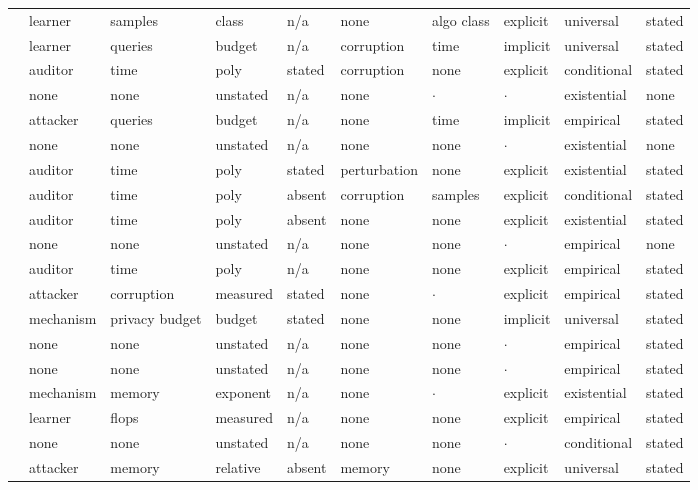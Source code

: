 \begin{landscape}
\begin{longtable}{rlllllllll}
\cite{WZDD24} & learner & samples & class & n/a & none & algo class & explicit & universal & stated \\
\cite{BBHS22} & learner & queries & budget & n/a & corruption & time & implicit & universal & stated \\
\cite{CHLX25} & auditor & time & poly & stated & corruption & none & explicit & conditional & stated \\
\cite{QMZAKFG24} & none & none & unstated & n/a & none & $\cdot$ & $\cdot$ & existential & none \\
\cite{NCM25} & attacker & queries & budget & n/a & none & time & implicit & empirical & stated \\
\cite{VG20} & none & none & unstated & n/a & none & none & $\cdot$ & existential & none \\
\cite{KKOSVZ24} & auditor & time & poly & stated & perturbation & none & explicit & existential & stated \\
\cite{GSVV25} & auditor & time & poly & absent & corruption & samples & explicit & conditional & stated \\
\cite{GKVZ22} & auditor & time & poly & absent & none & none & explicit & existential & stated \\
\cite{AKKTARXLNP25} & none & none & unstated & n/a & none & none & $\cdot$ & empirical & none \\
\cite{DGMRLW24} & auditor & time & poly & n/a & none & none & explicit & empirical & stated \\
\cite{RT24} & attacker & corruption & measured & stated & none & $\cdot$ & explicit & empirical & stated \\
\cite{SAHBS26} & mechanism & privacy budget & budget & stated & none & none & implicit & universal & stated \\
\cite{KJZXKOS25} & none & none & unstated & n/a & none & none & $\cdot$ & empirical & stated \\
\cite{PMSW18} & none & none & unstated & n/a & none & none & $\cdot$ & empirical & stated \\
\cite{KMNS21} & mechanism & memory & exponent & n/a & none & $\cdot$ & explicit & existential & stated \\
\cite{HBEORGATS24} & learner & flops & measured & n/a & none & none & explicit & empirical & stated \\
\cite{AGK22} & none & none & unstated & n/a & none & none & $\cdot$ & conditional & stated \\
\cite{DQW22} & attacker & memory & relative & absent & memory & none & explicit & universal & stated \\

\end{longtable}
\end{landscape}
